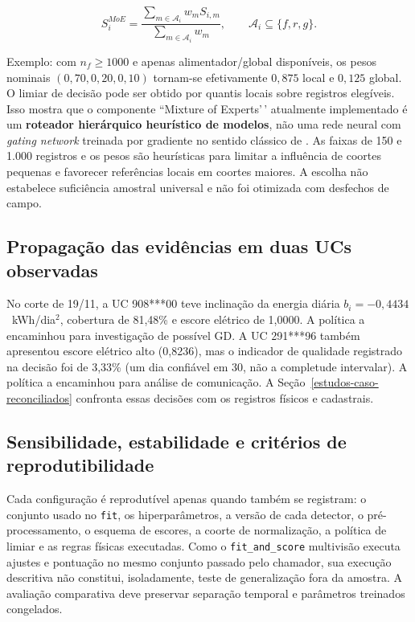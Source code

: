 \[S^{MoE}_i=\frac{\sum_{m\in\mathcal A_i}w_mS_{i,m}}{\sum_{m\in\mathcal A_i}w_m},\qquad \mathcal A_i\subseteq\{f,r,g\}.\]

Exemplo: com \(n_f\ge1000\) e apenas alimentador/global disponíveis, os pesos nominais \((0{,}70,0{,}20,0{,}10)\) tornam-se efetivamente \(0{,}875\) local e \(0{,}125\) global. O limiar de decisão pode ser obtido por quantis locais sobre registros elegíveis. Isso mostra que o componente ``Mixture of Experts'\,' atualmente implementado é um \textbf{roteador hierárquico heurístico de modelos}, não uma rede neural com \emph{gating network} treinada por gradiente no sentido clássico de \textcite{jacobs1991}. As faixas de 150 e 1.000 registros e os pesos são heurísticas para limitar a influência de coortes pequenas e favorecer referências locais em coortes maiores. A escolha não estabelece suficiência amostral universal e não foi otimizada com desfechos de campo.

\subsection{Propagação das evidências em duas UCs observadas}
No corte de 19/11, a UC 908***00 teve inclinação da energia diária \(b_i=-0{,}4434\)~kWh/dia\(^2\), cobertura de 81,48\% e escore elétrico de 1,0000. A política a encaminhou para investigação de possível GD. A UC 291***96 também apresentou escore elétrico alto (0,8236), mas o indicador de qualidade registrado na decisão foi de 3,33\% (um dia confiável em 30, não a completude intervalar). A política a encaminhou para análise de comunicação. A Seção~\ref{estudos-caso-reconciliados} confronta essas decisões com os registros físicos e cadastrais.

\subsection{Sensibilidade, estabilidade e critérios de reprodutibilidade}\label{sensibilidade-estabilidade-e-crituxe9rios-de-reprodutibilidade}

Cada configuração é reprodutível apenas quando também se registram: o conjunto usado no \texttt{fit}, os hiperparâmetros, a versão de cada detector, o pré-processamento, o esquema de escores, a coorte de normalização, a política de limiar e as regras físicas executadas. Como o \texttt{fit\_and\_score} multivisão executa ajustes e pontuação no mesmo conjunto passado pelo chamador, sua execução descritiva não constitui, isoladamente, teste de generalização fora da amostra. A avaliação comparativa deve preservar separação temporal e parâmetros treinados congelados.

